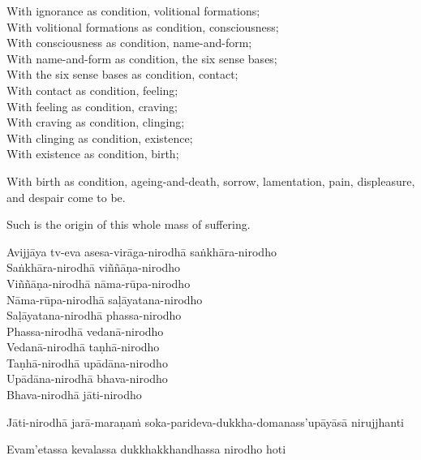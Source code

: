 \begin{english-verses}
  With ignorance as condition, volitional formations;\\
  With volitional formations as condition, consciousness;\\
  With consciousness as condition, name-and-form;\\
  With name-and-form as condition, the six sense bases;\\
  With the six sense bases as condition, contact;\\
  With contact as condition, feeling;\\
  With feeling as condition, craving;\\
  With craving as condition, clinging;\\
  With clinging as condition, existence;\\
  With existence as condition, birth;
  \begin{english-hangtogether-verses}
    With birth as condition, ageing-and-death, sorrow, lamentation, pain, displeasure, and despair come to be.
  \end{english-hangtogether-verses}
  \begin{english-hangtogether-verses}
    Such is the origin of this whole mass of suffering.
  \end{english-hangtogether-verses}
\end{english-verses}

\begin{pali-hang-continued}
  Avijjāya tv-eva asesa-virāga-nirodhā saṅkhāra-nirodho\\
  Saṅkhāra-nirodhā viññāṇa-nirodho\\
  Viññāṇa-nirodhā nāma-rūpa-nirodho\\
  Nāma-rūpa-nirodhā saḷāyatana-nirodho\\
  Saḷāyatana-nirodhā phassa-nirodho\\
  Phassa-nirodhā vedanā-nirodho\\
  Vedanā-nirodhā taṇhā-nirodho\\
  Taṇhā-nirodhā upādāna-nirodho\\
  Upādāna-nirodhā bhava-nirodho\\
  Bhava-nirodhā jāti-nirodho
  \begin{pali-hangtogether}
    Jāti-nirodhā jarā-maraṇaṁ soka-parideva-dukkha-domanass'upāyāsā nirujjhanti
  \end{pali-hangtogether}
  \begin{pali-hangtogether}
    Evam'etassa kevalassa dukkhakkhandhassa nirodho hoti
  \end{pali-hangtogether}
\end{pali-hang-continued}

